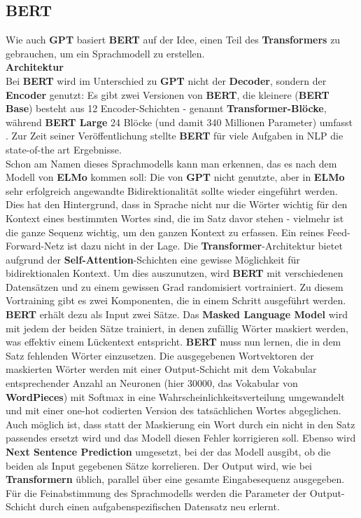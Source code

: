 \subsection{BERT}
Wie auch \textbf{GPT} basiert \textbf{BERT} auf der Idee, einen Teil des \textbf{Transformers} zu gebrauchen, um ein Sprachmodell zu erstellen.\\

\textbf{Architektur}\\
Bei \textbf{BERT} wird im Unterschied zu \textbf{GPT} nicht der \textbf{Decoder}, sondern der \textbf{Encoder} genutzt: Es gibt zwei Versionen von \textbf{BERT}, die kleinere (\textbf{BERT Base}) besteht aus 12 Encoder-Schichten - genannt \textbf{Transformer-Bl\"ocke}, w\"ahrend \textbf{BERT Large} 24 Bl\"ocke (und damit 340 Millionen Parameter) umfasst \cite{bert}. Zur Zeit seiner Ver\"offentlichung stellte \textbf{BERT} f\"ur viele Aufgaben in NLP die state-of-the art Ergebnisse.\\
Schon am Namen dieses Sprachmodells kann man erkennen, das es nach dem Modell von \textbf{ELMo} kommen soll: Die von \textbf{GPT} nicht genutzte, aber in \textbf{ELMo} sehr erfolgreich angewandte Bidirektionalit\"at sollte wieder eingef\"uhrt werden. Dies hat den Hintergrund, dass in Sprache nicht nur die W\"orter wichtig f\"ur den Kontext eines bestimmten Wortes sind, die im Satz davor stehen - vielmehr ist die ganze Sequenz wichtig, um den ganzen Kontext zu erfassen. Ein reines Feed-Forward-Netz ist dazu nicht in der Lage. Die \textbf{Transformer}-Architektur bietet aufgrund der \textbf{Self-Attention}-Schichten eine gewisse M\"oglichkeit f\"ur bidirektionalen Kontext. Um dies auszunutzen, wird \textbf{BERT} mit verschiedenen Datens\"atzen und zu einem gewissen Grad randomisiert vortrainiert. Zu diesem Vortraining gibt es zwei Komponenten, die in einem Schritt ausgef\"uhrt werden. \textbf{BERT} erh\"alt dezu als Input zwei S\"atze. Das \textbf{Masked Language Model} wird mit jedem der beiden S\"atze trainiert, in denen zuf\"allig W\"orter maskiert werden, was effektiv einem L\"uckentext entspricht. \textbf{BERT} muss nun lernen, die in dem Satz fehlenden W\"orter einzusetzen. Die ausgegebenen Wortvektoren der maskierten W\"orter werden mit einer Output-Schicht mit dem Vokabular entsprechender Anzahl an Neuronen (hier 30000, das Vokabular von \textbf{WordPieces}) mit Softmax in eine Wahrscheinlichkeitsverteilung umgewandelt und mit einer one-hot codierten Version des tats\"achlichen Wortes abgeglichen. Auch m\"oglich ist, dass statt der Maskierung ein Wort durch ein nicht in den Satz passendes ersetzt wird und das Modell diesen Fehler korrigieren soll. Ebenso wird \textbf{Next Sentence Prediction} umgesetzt, bei der das Modell  ausgibt, ob die beiden als Input gegebenen S\"atze korrelieren. Der Output wird, wie bei \textbf{Transformern} \"ublich, parallel \"uber eine gesamte Eingabesequenz ausgegeben.\\
F\"ur die Feinabstimmung des Sprachmodells werden die Parameter der Output-Schicht durch einen aufgabenspezifischen Datensatz neu erlernt.\\

